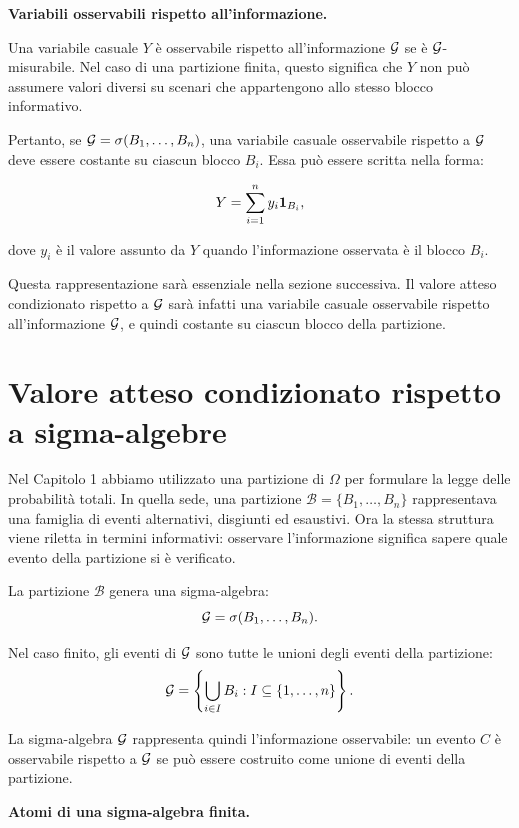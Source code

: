 \medskip

\noindent
\textbf{Variabili osservabili rispetto all'informazione.}

Una variabile casuale $Y$ \`{e} osservabile rispetto all'informazione $\mathcal{G}$ se \`{e} $\mathcal{G}$-misurabile. Nel caso di una partizione finita, questo significa che $Y$ non pu\`{o} assumere valori diversi su scenari che appartengono allo stesso blocco informativo.

Pertanto, se $\mathcal{G}=\sigma(B_1,\ldots,B_n)$, una variabile casuale osservabile rispetto a $\mathcal{G}$ deve essere costante su ciascun blocco $B_i$. Essa pu\`{o} essere scritta nella forma:

\[
Y
=
\sum_{i=1}^{n}
y_i\mathbf{1}_{B_i},
\]

dove $y_i$ \`{e} il valore assunto da $Y$ quando l'informazione osservata \`{e} il blocco $B_i$.

Questa rappresentazione sar\`{a} essenziale nella sezione successiva. Il valore atteso condizionato rispetto a $\mathcal{G}$ sar\`{a} infatti una variabile casuale osservabile rispetto all'informazione $\mathcal{G}$, e quindi costante su ciascun blocco della partizione.

\section{Valore atteso condizionato rispetto a sigma-algebre}

Nel Capitolo 1 abbiamo utilizzato una partizione di $\Omega$ per formulare la
legge delle probabilit\`{a} totali. In quella sede, una partizione
$\mathcal{B}=\{B_1,\ldots,B_n\}$ rappresentava una famiglia di eventi
alternativi, disgiunti ed esaustivi. Ora la stessa struttura viene riletta in
termini informativi: osservare l'informazione significa sapere quale evento
della partizione si \`{e} verificato.

La partizione $\mathcal{B}$ genera una sigma-algebra:
\[
\mathcal{G}
=
\sigma(B_1,\ldots,B_n).
\]

Nel caso finito, gli eventi di $\mathcal{G}$ sono tutte le unioni degli eventi
della partizione:
\[
\mathcal{G}
=
\left\{
\bigcup_{i\in I}B_i:
I\subseteq\{1,\ldots,n\}
\right\}.
\]

La sigma-algebra $\mathcal{G}$ rappresenta quindi l'informazione osservabile:
un evento $C$ \`{e} osservabile rispetto a $\mathcal{G}$ se pu\`{o} essere
costruito come unione di eventi della partizione.

\medskip

\noindent
\textbf{Atomi di una sigma-algebra finita.}

